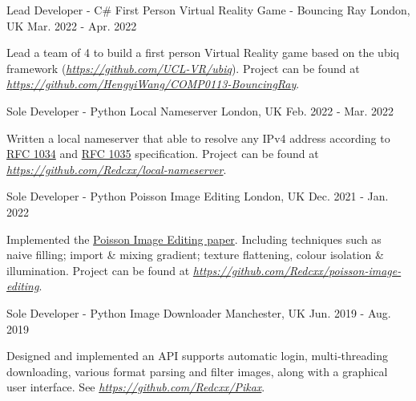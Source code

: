 \begin{cventries}
  \cventry
    {Lead Developer - C\#} %
    {First Person Virtual Reality Game - Bouncing Ray} %
    {London, UK} %
    {Mar. 2022 - Apr. 2022} %
    {
      \begin{cvitems} %
        \item {Lead a team of 4 to build a first person Virtual Reality game based on the ubiq framework (\href{https://github.com/UCL-VR/ubiq}{\textit{https://github.com/UCL-VR/ubiq}}). Project can be found at \href{https://github.com/HengyiWang/COMP0113-BouncingRay}{\textit{https://github.com/HengyiWang/COMP0113-BouncingRay}}.}
      \end{cvitems}
    }
  
  \cventry
    {Sole Developer - Python} %
    {Local Nameserver} %
    {London, UK} %
    {Feb. 2022 - Mar. 2022} %
    {
      \begin{cvitems} %
        \item {Written a local nameserver that able to resolve any IPv4 address according to \href{https://datatracker.ietf.org/doc/html/rfc1034}{RFC 1034} and \href{https://datatracker.ietf.org/doc/html/rfc1035}{RFC 1035} specification. Project can be found at \href{https://github.com/Redcxx/local-nameserver}{\textit{https://github.com/Redcxx/local-nameserver}}.}
      \end{cvitems}
    }
    
  \cventry
    {Sole Developer - Python} %
    {Poisson Image Editing} %
    {London, UK} %
    {Dec. 2021 - Jan. 2022} %
    {
      \begin{cvitems} %
        \item {Implemented the \href{https://www.cs.jhu.edu/~misha/Fall07/Papers/Perez03.pdf}{Poisson Image Editing paper}. Including techniques such as naive filling; import \& mixing gradient; texture flattening, colour isolation \& illumination.  Project can be found at \href{https://github.com/Redcxx/poisson-image-editing}{\textit{https://github.com/Redcxx/poisson-image-editing}}.}
      \end{cvitems}
    }

  \cventry
    {Sole Developer - Python} %
    {Image Downloader} %
    {Manchester, UK} %
    {Jun. 2019 - Aug. 2019} %
    {
      \begin{cvitems} %
        \item {Designed and implemented an API supports automatic login, multi‑threading downloading, various format parsing and filter images, along with a graphical user interface. See \href{https://github.com/Redcxx/Pikax}{\textit{https://github.com/Redcxx/Pikax}}.}
      \end{cvitems}
    }
    

\end{cventries}
